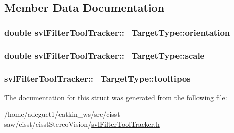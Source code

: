 \subsection{Member Data Documentation}
\hypertarget{structsvl_filter_tool_tracker_1_1___target_type_a8a69c9b0f6d7a51e35c0b9298786bfa0}{
\subsubsection[{orientation}]{\setlength{\rightskip}{0pt plus 5cm}double svl\-Filter\-Tool\-Tracker\-::\-\_\-\-Target\-Type\-::orientation}}\label{structsvl_filter_tool_tracker_1_1___target_type_a8a69c9b0f6d7a51e35c0b9298786bfa0}
\hypertarget{structsvl_filter_tool_tracker_1_1___target_type_a41580992baafb3f771b25c8c7d133477}{
\subsubsection[{scale}]{\setlength{\rightskip}{0pt plus 5cm}double svl\-Filter\-Tool\-Tracker\-::\-\_\-\-Target\-Type\-::scale}}\label{structsvl_filter_tool_tracker_1_1___target_type_a41580992baafb3f771b25c8c7d133477}
\hypertarget{structsvl_filter_tool_tracker_1_1___target_type_a66b5c46a3d281d97a8394b62afce58d1}{
\subsubsection[{tooltipos}]{ svl\-Filter\-Tool\-Tracker\-::\-\_\-\-Target\-Type\-::tooltipos}}\label{structsvl_filter_tool_tracker_1_1___target_type_a66b5c46a3d281d97a8394b62afce58d1}


The documentation for this struct was generated from the following file\-:\begin{DoxyCompactItemize}
\item 
/home/adeguet1/catkin\-\_\-ws/src/cisst-\/saw/cisst/cisst\-Stereo\-Vision/\hyperlink{svl_filter_tool_tracker_8h}{svl\-Filter\-Tool\-Tracker.\-h}\end{DoxyCompactItemize}
